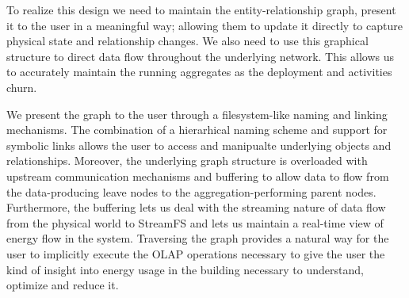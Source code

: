 To realize this design we need to maintain the entity-relationship graph, present it to the user in a meaningful
way; allowing them to update it directly to capture physical state and relationship changes.  We also need to
use this graphical structure to direct data flow throughout the underlying network.  This allows us
to accurately maintain the running aggregates as the deployment and activities churn.

We present the graph to the user through a filesystem-like naming and linking mechanisms.  The combination of a
hierarhical naming scheme and support for symbolic links allows the user to access and manipualte underlying objects
and relationships.  Moreover, the underlying graph structure is overloaded with upstream communication mechanisms
and buffering to allow data to flow from the data-producing leave nodes to the aggregation-performing
parent nodes.  Furthermore, the buffering lets us deal with the streaming nature of data flow from the physical
world to StreamFS and lets us maintain a real-time view of energy flow in the system.
Traversing the graph provides a natural way for the user to implicitly execute the OLAP operations necessary 
to give the user the kind of insight into energy usage in the building necessary to understand, optimize and 
reduce it.